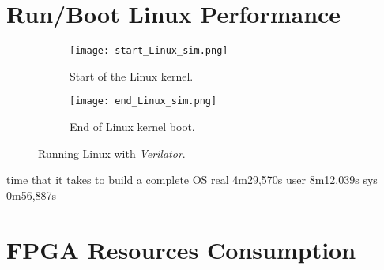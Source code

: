 \section{Run/Boot Linux Performance}
\begin{figure}
    \centering
    \begin{subfigure}[b]{0.49\textwidth}
        \centering
        \texttt{[image: start\_Linux\_sim.png]}
        \caption{Start of the Linux kernel.}
        \label{fig:start_linux_verilator}
    \end{subfigure}
    \hfill
    \begin{subfigure}[b]{0.49\textwidth}
        \centering
        \texttt{[image: end\_Linux\_sim.png]}
        \caption{End of Linux kernel boot.}
        \label{fig:end_linux_verilator}
    \end{subfigure}
    \caption{Running Linux with \textit{Verilator}.}
    \label{fig:linux_verilator}
\end{figure}
time that it takes to build a complete OS
real	4m29,570s
user	8m12,039s
sys	0m56,887s

\section{FPGA Resources Consumption}